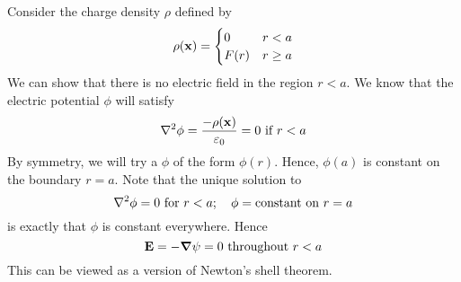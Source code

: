 Consider the charge density \(\rho\) defined by
\[
	\rho(\vb x) = \begin{cases}
		0    & r < a    \\
		F(r) & r \geq a
	\end{cases}
\]
We can show that there is no electric field in the region \(r < a\).
We know that the electric potential \(\phi\) will satisfy
\[
	\laplacian{\phi} = \frac{-\rho(\vb x)}{\varepsilon_0} = 0 \text{ if } r<a
\]
By symmetry, we will try a \(\phi\) of the form \(\phi(r)\).
Hence, \(\phi(a)\) is constant on the boundary \(r=a\).
Note that the unique solution to
\[
	\laplacian{\phi} = 0 \text{ for } r<a;\quad \phi = \text{constant on } r = a
\]
is exactly that \(\phi\) is constant everywhere.
Hence
\[
	\vb E = -\grad{\psi} = 0 \text{ throughout } r<a
\]
This can be viewed as a version of Newton's shell theorem.
